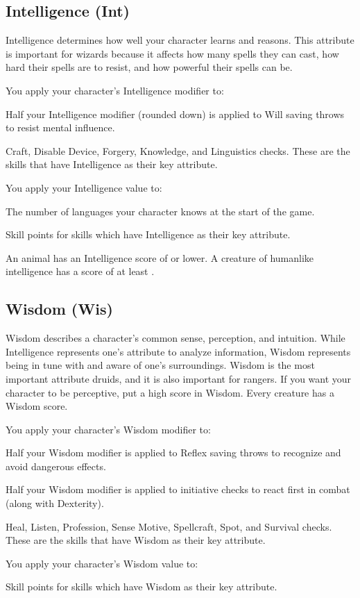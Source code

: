 \subsection{Intelligence (Int)}
Intelligence determines how well your character learns and reasons. This attribute is important for wizards because it affects how many spells they can cast, how hard their spells are to resist, and how powerful their spells can be.

You apply your character's Intelligence modifier to:
\begin{itemize*}
\item Half your Intelligence modifier (rounded down) is applied to Will saving throws to resist mental influence.
\item Craft, Disable Device, Forgery, Knowledge, and Linguistics checks. These are the skills that have Intelligence as their key attribute.
\end{itemize*}

\par You apply your Intelligence value to:
\begin{itemize*}
\item The number of languages your character knows at the start of the game.
\item Skill points for skills which have Intelligence as their key attribute.
\end{itemize*}

\par An animal has an Intelligence score of  or lower. A creature of humanlike intelligence has a score of at least .

\subsection{Wisdom (Wis)}
Wisdom describes a character's common sense, perception, and intuition. While Intelligence represents one's attribute to analyze information, Wisdom represents being in tune with and aware of one's surroundings. Wisdom is the most important attribute druids, and it is also important for rangers. If you want your character to be perceptive, put a high score in Wisdom. Every creature has a Wisdom score.

You apply your character's Wisdom modifier to:
\begin{itemize*}
\item Half your Wisdom modifier is applied to Reflex saving throws to recognize and avoid dangerous effects.
\item Half your Wisdom modifier is applied to initiative checks to react first in combat (along with Dexterity).
\item Heal, Listen, Profession, Sense Motive, Spellcraft, Spot, and Survival checks. These are the skills that have Wisdom as their key attribute.
\end{itemize*}
You apply your character's Wisdom value to:
\begin{itemize*}
\item Skill points for skills which have Wisdom as their key attribute.
\end{itemize*}

